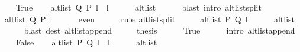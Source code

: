 \begin{isabellebody}
\ \ \isamarkupfalse%
\ True\isanewline
\ \ \isamarkupfalse%
\ {\isachardoublequoteopen}alt{\isacharunderscore}{\kern0pt}list\ Q\ P\ {\isacharparenleft}{\kern0pt}l{}\ {\isacharat}{\kern0pt}\ l{}{\isacharparenright}{\kern0pt}{\isachardoublequoteclose}\isanewline
\ \ \ \ \isamarkupfalse%
\ alt{\isacharunderscore}{\kern0pt}list\isanewline
\ \ \ \ \isamarkupfalse%
\ {\isacharparenleft}{\kern0pt}blast\ intro{\isacharcolon}{\kern0pt}\ alt{\isacharunderscore}{\kern0pt}list{\isacharunderscore}{\kern0pt}split{\isacharunderscore}{\kern0pt}{}{\isacharparenright}{\kern0pt}\isanewline
\ \ \isamarkupfalse%
\ {\isachardoublequoteopen}alt{\isacharunderscore}{\kern0pt}list\ Q\ P\ l{}{\isachardoublequoteclose}\isanewline
\ \ \ \ \isamarkupfalse%
\ even\isanewline
\ \ \ \ \isamarkupfalse%
\ {\isacharparenleft}{\kern0pt}rule\ alt{\isacharunderscore}{\kern0pt}list{\isacharunderscore}{\kern0pt}split{\isacharunderscore}{\kern0pt}{}{\isacharparenright}{\kern0pt}\isanewline
\ \ \isamarkupfalse%
\ \isamarkupfalse%
\ {\isachardoublequoteopen}alt{\isacharunderscore}{\kern0pt}list\ P\ Q\ l{}{\isachardoublequoteclose}\isanewline
\ \ \ \ \isamarkupfalse%
\ alt{\isacharunderscore}{\kern0pt}list\isanewline
\ \ \ \ \isamarkupfalse%
\ {\isacharparenleft}{\kern0pt}blast\ dest{\isacharcolon}{\kern0pt}\ alt{\isacharunderscore}{\kern0pt}list{\isacharunderscore}{\kern0pt}append{\isacharunderscore}{\kern0pt}{}{\isacharparenright}{\kern0pt}\isanewline
\ \ \isamarkupfalse%
\ \isamarkupfalse%
\ {\isacharquery}{\kern0pt}thesis\isanewline
\ \ \ \ \isamarkupfalse%
\ True\isanewline
\ \ \ \ \isamarkupfalse%
\ {\isacharparenleft}{\kern0pt}intro\ alt{\isacharunderscore}{\kern0pt}list{\isacharunderscore}{\kern0pt}append{\isacharunderscore}{\kern0pt}{}{\isacharparenright}{\kern0pt}\isanewline
{}\isamarkupfalse%
\isanewline
\ \ \isamarkupfalse%
\ False\isanewline
\ \ \isamarkupfalse%
\ {\isachardoublequoteopen}alt{\isacharunderscore}{\kern0pt}list\ P\ Q\ {\isacharparenleft}{\kern0pt}l{}\ {\isacharat}{\kern0pt}\ l{}{\isacharparenright}{\kern0pt}{\isachardoublequoteclose}\isanewline
\ \ \ \ \isamarkupfalse%
\ alt{\isacharunderscore}{\kern0pt}list\isanewline
\ \ \ \ \isamarkupfalse%

\end{isabellebody}
